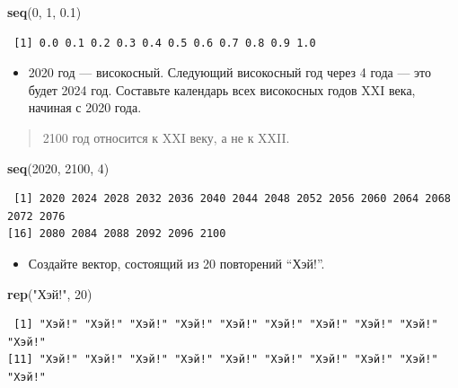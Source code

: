 \documentclass[
]{book}
\newenvironment{Shaded}{\begin{snugshade}}{\end{snugshade}}
\newcommand{\DecValTok}[1]{\textcolor[rgb]{0.00,0.00,0.81}{#1}}
\newcommand{\FloatTok}[1]{\textcolor[rgb]{0.00,0.00,0.81}{#1}}
\newcommand{\KeywordTok}[1]{\textcolor[rgb]{0.13,0.29,0.53}{\textbf{#1}}}
\newcommand{\NormalTok}[1]{#1}
\newcommand{\StringTok}[1]{\textcolor[rgb]{0.31,0.60,0.02}{#1}}
\providecommand{\tightlist}{%
  \setlength{\itemsep}{0pt}\setlength{\parskip}{0pt}}
\begin{document}
\begin{Shaded}
\begin{Highlighting}[]
\KeywordTok{seq}\NormalTok{(}\DecValTok{0}\NormalTok{, }\DecValTok{1}\NormalTok{, }\FloatTok{0.1}\NormalTok{)}
\end{Highlighting}
\end{Shaded}

\begin{verbatim}
 [1] 0.0 0.1 0.2 0.3 0.4 0.5 0.6 0.7 0.8 0.9 1.0
\end{verbatim}

\begin{itemize}
\tightlist
\item
  2020 год --- високосный. Следующий високосный год через 4 года --- это будет 2024 год. Составьте календарь всех високосных годов XXI века, начиная с 2020 года.
\end{itemize}

\begin{quote}
2100 год относится к XXI веку, а не к XXII.
\end{quote}

\begin{Shaded}
\begin{Highlighting}[]
\KeywordTok{seq}\NormalTok{(}\DecValTok{2020}\NormalTok{, }\DecValTok{2100}\NormalTok{, }\DecValTok{4}\NormalTok{)}
\end{Highlighting}
\end{Shaded}

\begin{verbatim}
 [1] 2020 2024 2028 2032 2036 2040 2044 2048 2052 2056 2060 2064 2068 2072 2076
[16] 2080 2084 2088 2092 2096 2100
\end{verbatim}

\begin{itemize}
\tightlist
\item
  Создайте вектор, состоящий из 20 повторений ``Хэй!''.
\end{itemize}

\begin{Shaded}
\begin{Highlighting}[]
\KeywordTok{rep}\NormalTok{(}\StringTok{"Хэй!"}\NormalTok{, }\DecValTok{20}\NormalTok{)}
\end{Highlighting}
\end{Shaded}

\begin{verbatim}
 [1] "Хэй!" "Хэй!" "Хэй!" "Хэй!" "Хэй!" "Хэй!" "Хэй!" "Хэй!" "Хэй!" "Хэй!"
[11] "Хэй!" "Хэй!" "Хэй!" "Хэй!" "Хэй!" "Хэй!" "Хэй!" "Хэй!" "Хэй!" "Хэй!"
\end{verbatim}
\end{document}
